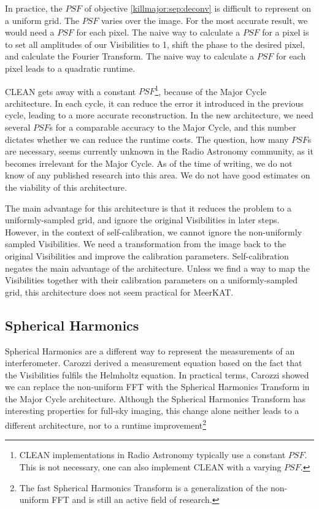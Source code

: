 In practice, the $PSF$ of objective \eqref{killmajor:sep:deconv} is difficult to represent on a uniform grid. The $PSF$ varies over the image. For the most accurate result, we would need a $PSF$ for each pixel. The naive way to calculate a $PSF$ for a pixel is to set all amplitudes of our Visibilities to 1, shift the phase to the desired pixel, and calculate the Fourier Transform. The naive way to calculate a $PSF$ for each pixel leads to a quadratic runtime.

CLEAN gets away with a constant $PSF$\footnote{CLEAN implementations in Radio Astronomy typically use a constant $PSF$. This is not necessary, one can also implement CLEAN with a varying $PSF$.}, because of the Major Cycle architecture. In each cycle, it can reduce the error it introduced in the previous cycle, leading to a more accurate reconstruction. In the new architecture, we need several $PSF$s for a comparable accuracy to the Major Cycle, and this number dictates whether we can reduce the runtime costs. The question, how many $PSF$s are necessary, seems currently unknown in the Radio Astronomy community, as it becomes irrelevant for the Major Cycle. As of the time of writing, we do not know of any published research into this area. We do not have good estimates on the viability of this architecture.

The main advantage for this architecture is that it reduces the problem to a uniformly-sampled grid, and ignore the original Visibilities in later steps. However, in the context of self-calibration, we cannot ignore the non-uniformly sampled Visibilities. We need a transformation from the image back to the original Visibilities and improve the calibration parameters. Self-calibration negates the main advantage of the architecture. Unless we find a way to map the Visibilities together with their calibration parameters on a uniformly-sampled grid, this architecture does not seem practical for MeerKAT.


\subsection{Spherical Harmonics}
Spherical Harmonics are a different way to represent the measurements of an interferometer. Carozzi\cite{carozzi2015imaging} derived a measurement equation based on the fact that the Visibilities fulfils the Helmholtz equation. In practical terms, Carozzi showed we can replace the non-uniform FFT with the Spherical Harmonics Transform in the Major Cycle architecture. Although the Spherical Harmonics Transform has interesting properties for full-sky imaging, this change alone neither leads to a different architecture, nor to a runtime improvement\footnote{The fast Spherical Harmonics Transform is a generalization of the non-uniform FFT\cite{kunisnonequispaced} and is still an active field of research\cite{schaeffer2013efficient}.}

